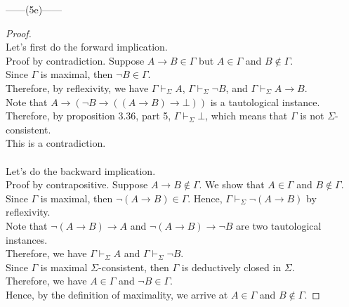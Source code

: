 \documentclass[12pt]{article}
\newcommand{\dr}{\vdash_{\Sigma}}
\begin{document}
\noindent
\begin{center}
    ------(5e)------
\end{center} 
\begin{proof} $ $\\
    Let's first do the forward implication.\\
    Proof by contradiction. Suppose $A \to B \in \Gamma$ but $A \in \Gamma$ and $B \notin \Gamma$.\\
    Since $\Gamma$ is maximal, then $\neg B \in \Gamma$.\\
    Therefore, by reflexivity, we have $\Gamma \dr A$, $\Gamma \dr \neg B$, and $\Gamma \dr A \to B$.\\
    Note that $A \to (\neg B \to ((A \to B) \to \bot))$ is a tautological instance.
    Therefore, by proposition 3.36, part 5, $\Gamma \dr \bot$, which means that $\Gamma$ is not $\Sigma$-consistent.\\
    This is a contradiction.\\
    \\
    Let's do the backward implication.\\
    Proof by contrapositive. Suppose $A \to B \notin \Gamma$. We show that $A \in \Gamma$ and $B \notin \Gamma$.\\
    Since $\Gamma$ is maximal, then $\neg(A \to B) \in \Gamma$.
    Hence, $\Gamma \dr \neg(A \to B)$ by reflexivity.\\
    Note that $\neg(A \to B) \to A$ and $\neg(A \to B) \to \neg B$ are two tautological instances.\\
    Therefore, we have $\Gamma \dr A$ and $\Gamma \dr \neg B$.\\
    Since $\Gamma$ is maximal $\Sigma$-consistent, then $\Gamma$ is deductively closed in $\Sigma$.\\
    Therefore, we have $A \in \Gamma$ and $\neg B \in \Gamma$.\\
    Hence, by the definition of maximality, we arrive at $A \in \Gamma$ and $B \notin \Gamma$.


\end{proof}
\end{document}
